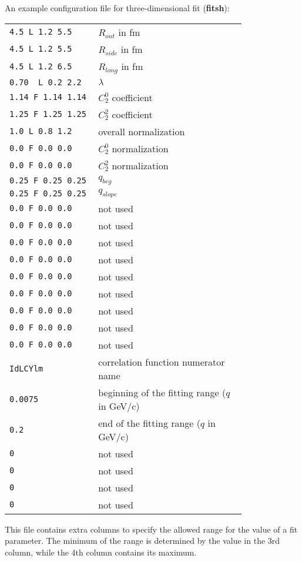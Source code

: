       An example configuration file for three-dimensional fit (\textbf{fitsh}):
      \begin{longtable}{p{0.3\linewidth}p{0.5\linewidth}}
        \verb|4.5 L 1.2 5.5|      & $R_{out}$ in fm\\
        \verb|4.5 L 1.2 5.5|      & $R_{side}$ in fm\\
        \verb|4.5 L 1.2 6.5|      & $R_{long}$ in fm\\
        \verb|0.70  L 0.2 2.2|    & $\lambda$\\
        \verb|1.14 F 1.14 1.14|   & $C_2^0$ coefficient\\
        \verb|1.25 F 1.25 1.25|   & $C_2^2$ coefficient\\
        \verb|1.0 L 0.8 1.2|      & overall normalization\\
        \verb|0.0 F 0.0 0.0|      & $C_2^0$ normalization\\
        \verb|0.0 F 0.0 0.0|      & $C_2^2$ normalization\\
        \verb|0.25 F 0.25 0.25|   & $q_{beg}$ \\
        \verb|0.25 F 0.25 0.25|   & $q_{slope}$ \\
        \verb|0.0 F 0.0 0.0|      & not used\\
        \verb|0.0 F 0.0 0.0|      & not used\\
        \verb|0.0 F 0.0 0.0|      & not used\\
        \verb|0.0 F 0.0 0.0|      & not used\\
        \verb|0.0 F 0.0 0.0|      & not used\\
        \verb|0.0 F 0.0 0.0|      & not used\\
        \verb|0.0 F 0.0 0.0|      & not used\\
        \verb|0.0 F 0.0 0.0|      & not used\\
        \verb|0.0 F 0.0 0.0|      & not used\\
        \verb|IdLCYlm|            & correlation function numerator name\\
        \verb|0.0075|             & beginning of the fitting range ($q$ in GeV/c)\\
        \verb|0.2|                & end of the fitting range ($q$ in GeV/c)\\
        \verb|0|                  & not used\\
        \verb|0|                  & not used\\
        \verb|0|                  & not used\\
        \verb|0|                  & not used\\
      \end{longtable}
      This file contains extra columns to specify the allowed range for the value of a fit parameter.
      The minimum of the range is determined by the value in the 3rd column, while the 4th column contains its maximum.

